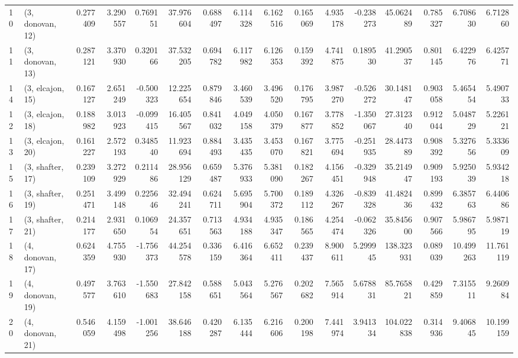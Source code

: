 \begin{tabular}{llrrrrrrrrrrrrrr}
10 &  (3, donovan, 12) &   0.277409 &  3.290557 &  0.769151 &   37.976604 &  0.688497 &   6.114328 &   6.162516 &  0.165069 &   4.935178 & -0.238273 &   45.062489 &  0.785327 &   6.708630 &   6.712860 \\
11 &  (3, donovan, 13) &   0.287121 &  3.370930 &  0.320166 &   37.532205 &  0.694782 &   6.117982 &   6.126353 &  0.159392 &   4.741875 &  0.189530 &   41.290537 &  0.801145 &   6.422976 &   6.425771 \\
14 &  (3, elcajon, 15) &   0.167127 &  2.651249 & -0.500323 &   12.225654 &  0.879846 &   3.460539 &   3.496520 &  0.176795 &   3.987270 & -0.526272 &   30.148147 &  0.903058 &   5.465454 &   5.490733 \\
12 &  (3, elcajon, 18) &   0.188982 &  3.013923 & -0.099415 &   16.405567 &  0.841032 &   4.049158 &   4.050379 &  0.167877 &   3.778852 & -1.350067 &   27.312340 &  0.912044 &   5.048729 &   5.226121 \\
13 &  (3, elcajon, 20) &   0.161227 &  2.572193 &  0.348540 &   11.923694 &  0.884493 &   3.435435 &   3.453070 &  0.167821 &   3.775694 & -0.251935 &   28.447389 &  0.908392 &   5.327656 &   5.333609 \\
15 &  (3, shafter, 17) &   0.239109 &  3.272929 &  0.211486 &   28.956129 &  0.659487 &   5.376933 &   5.381090 &  0.182267 &   4.156451 & -0.329948 &   35.214947 &  0.909193 &   5.925039 &   5.934218 \\
16 &  (3, shafter, 19) &   0.251471 &  3.499148 &  0.225646 &   32.494241 &  0.624711 &   5.695904 &   5.700372 &  0.189112 &   4.326267 & -0.839328 &   41.482436 &  0.899432 &   6.385763 &   6.440686 \\
17 &  (3, shafter, 21) &   0.214177 &  2.931650 &  0.106954 &   24.357651 &  0.713563 &   4.934188 &   4.935347 &  0.186565 &   4.254474 & -0.062326 &   35.845600 &  0.907566 &   5.986795 &   5.987119 \\
18 &  (4, donovan, 17) &   0.624359 &  4.755930 & -1.756373 &   44.254578 &  0.336159 &   6.416364 &   6.652411 &  0.239437 &   8.900611 &  5.299945 &  138.323931 &  0.089039 &  10.499263 &  11.761119 \\
19 &  (4, donovan, 19) &   0.497577 &  3.763610 & -1.550683 &   27.842158 &  0.588651 &   5.043564 &   5.276567 &  0.202682 &   7.565914 &  5.678831 &   85.765821 &  0.429859 &   7.315511 &   9.260984 \\
20 &  (4, donovan, 21) &   0.546059 &  4.159498 & -1.001256 &   38.646188 &  0.420287 &   6.135444 &   6.216606 &  0.200198 &   7.441974 &  3.941334 &  104.022838 &  0.314936 &   9.406845 &  10.199159 \\

\end{tabular}
